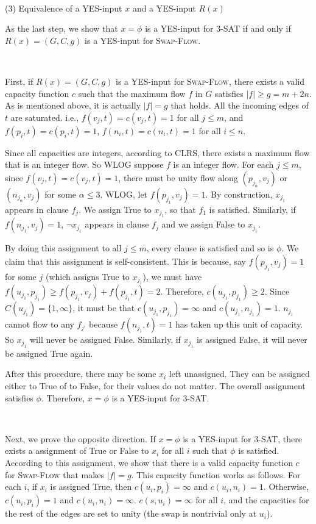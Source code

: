 \documentclass{article}
\begin{document}
~

\noindent(3) Equivalence of a YES-input $x$ and a YES-input $R(x)$

As the last step, we show that $x=\phi$ is a YES-input for \textsc{3-SAT} if and only if $R(x)=(G,C,g)$ is a YES-input for \textsc{Swap-Flow}.

~

First, if $R(x)=(G,C,g)$ is a YES-input for \textsc{Swap-Flow}, there exists a valid capacity function $c$ such that the maximum flow $f$ in $G$ satisfies $|f|\geqslant g=m+2n$. As is mentioned above, it is actually $|f|=g$ that holds. All the incoming edges of $t$ are saturated. i.e., $f(v_j,t)=c(v_j,t)=1$ for all $j\leqslant m$, and $f(p_i,t)=c(p_i,t)=1$, $f(n_i,t)=c(n_i,t)=1$ for all $i\leqslant n$.

Since all capacities are integers, according to CLRS, there exists a maximum flow that is an integer flow. So WLOG suppose $f$ is an integer flow. For each $j\leqslant m$, since $f(v_j,t)=c(v_j,t)=1$, there must be unity flow along $(p_{j_\alpha},v_j)$ or $(n_{j_\alpha},v_j)$ for some $\alpha\leqslant3$. WLOG, let $f(p_{j_1},v_j)=1$. By construction, $x_{j_1}$ appears in clause $f_j$. We assign True to $x_{j_1}$, so that $f_1$ is satisfied. Similarly, if $f(n_{j_1},v_j)=1$, $\neg x_{j_1}$ appears in clause $f_j$ and we assign False to $x_{j_1}$.

By doing this assignment to all $j\leqslant m$, every clause is satisfied and so is $\phi$. We claim that this assignment is self-consistent. This is because, say $f(p_{j_1},v_j)=1$ for some $j$ (which assigns True to $x_{j_1}$), we must have $f(u_{j_1},p_{j_1})\geqslant f(p_{j_1},v_j)+f(p_{j_1},t)=2$. Therefore, $c(u_{j_1},p_{j_1})\geqslant2$. Since $C(u_{j_1})=\{1,\infty\}$, it must be that $c(u_{j_1},p_{j_1})=\infty$ and $c(u_{j_1},n_{j_1})=1$. $n_{j_1}$ cannot flow to any $f_{j'}$ because $f(n_{j_1},t)=1$ has taken up this unit of capacity. So $x_{j_1}$ will never be assigned False. Similarly, if $x_{j_1}$ is assigned False, it will never be assigned True again.

After this procedure, there may be some $x_i$ left unassigned. They can be assigned either to True of to False, for their values do not matter. The overall assignment satisfies $\phi$. Therefore, $x=\phi$ is a YES-input for \textsc{3-SAT}.

~

Next, we prove the opposite direction. If $x=\phi$ is a YES-input for \textsc{3-SAT}, there exists a assignment of True or False to $x_i$ for all $i$ such that $\phi$ is satisfied. According to this assignment, we show that there is a valid capacity function $c$ for \textsc{Swap-Flow} that makes $|f|=g$. This capacity function works as follows. For each $i$, if $x_i$ is assigned True, then $c(u_i,p_i)=\infty$ and $c(u_i,n_i)=1$. Otherwise, $c(u_i,p_i)=1$ and $c(u_i,n_i)=\infty$. $c(s,u_i)=\infty$ for all $i$, and the capacities for the rest of the edges are set to unity (the swap is nontrivial only at $u_i$).
\end{document}
